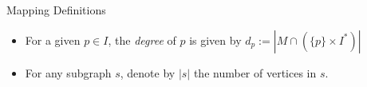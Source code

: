 \begin{frame}{Mapping Definitions}
\begin{itemize}


\item
For a given $p \in I$, the \emph{degree} of $p$ 
is given by $d_p := |M \cap (\{p\} \times I^*)|$ 

\item
For any subgraph $s$, denote by $|s|$ the number of vertices in $s$.

\end{itemize}
\end{frame}